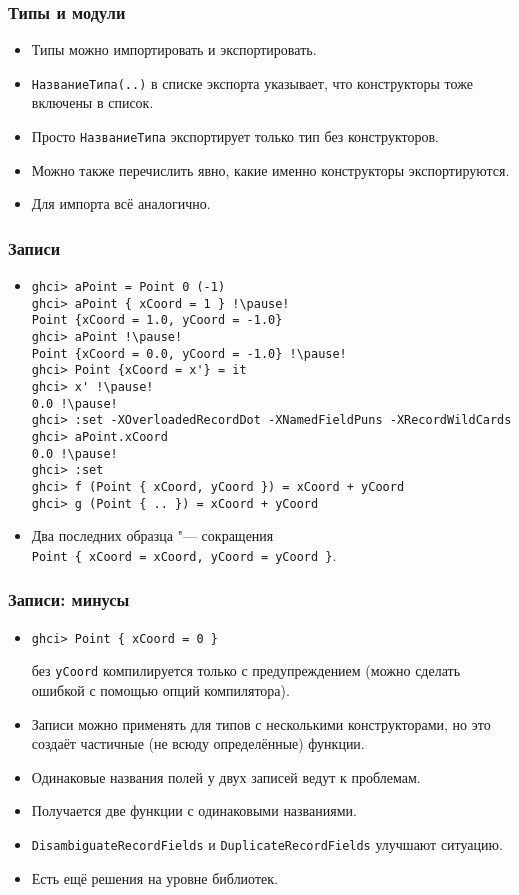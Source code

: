 \documentclass[10pt]{beamer}
\begin{document}
\begin{frame}[fragile]
\frametitle{Типы и модули}
\begin{itemize}
    \item Типы можно импортировать и экспортировать.
    \item \lstinline|НазваниеТипа(..)| в списке экспорта указывает, что конструкторы тоже включены в список.
    \item Просто \lstinline|НазваниеТипа| экспортирует только тип без конструкторов.
    \item Можно также перечислить явно, какие именно конструкторы экспортируются.
    \item Для импорта всё аналогично.
\end{itemize}
\end{frame}

\begin{frame}[fragile]
\frametitle{Записи}\hypertarget{rec2}{}
\hyperlink{rec1}{}
\begin{itemize}
\item 
\begin{lstlisting}[basicstyle=\ttfamily\footnotesize]
ghci> aPoint = Point 0 (-1)
ghci> aPoint { xCoord = 1 } !\pause!
Point {xCoord = 1.0, yCoord = -1.0}
ghci> aPoint !\pause!
Point {xCoord = 0.0, yCoord = -1.0} !\pause!
ghci> Point {xCoord = x'} = it
ghci> x' !\pause!
0.0 !\pause!
ghci> :set -XOverloadedRecordDot -XNamedFieldPuns -XRecordWildCards
ghci> aPoint.xCoord
0.0 !\pause!
ghci> :set 
ghci> f (Point { xCoord, yCoord }) = xCoord + yCoord
ghci> g (Point { .. }) = xCoord + yCoord
\end{lstlisting}
\item Два последних образца "--- сокращения\\ \lstinline[basicstyle=\ttfamily\small]|Point { xCoord = xCoord, yCoord = yCoord }|.
\end{itemize}
\end{frame}

\begin{frame}[fragile]
\frametitle{Записи: минусы}\hypertarget{rec2}{}
\hyperlink{rec1}{}
\begin{itemize}
    \item
\begin{lstlisting}
ghci> Point { xCoord = 0 }
\end{lstlisting}
    \pause
    без \lstinline|yCoord| компилируется только с предупреждением (можно сделать ошибкой с помощью опций компилятора).
    \pause 
    \item Записи можно применять для типов с несколькими конструкторами, но это создаёт частичные (не всюду определённые) функции.
    \pause
    \item Одинаковые названия полей у двух записей ведут к проблемам. 
    \pause
    \item Получается две функции с одинаковыми названиями.
    \item \lstinline|DisambiguateRecordFields| и \lstinline|DuplicateRecordFields| улучшают ситуацию.
    \pause
    \item Есть ещё решения на уровне библиотек.
\end{itemize}
\end{frame}
\end{document}
